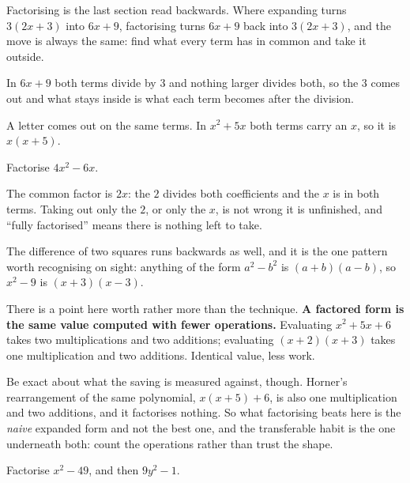 \begin{fr}
Factorising is the last section read backwards. Where expanding turns
$3(2x + 3)$ into $6x + 9$, factorising turns $6x + 9$ back into $3(2x + 3)$,
and the move is always the same: find what every term has in common and take
it outside.

In $6x + 9$ both terms divide by $3$ and nothing larger divides both, so the
$3$ comes out and what stays inside is what each term becomes after the
division.

A letter comes out on the same terms. In $x^{2} + 5x$ both terms carry an $x$,
so it is $x(x + 5)$.

Factorise $4x^{2} - 6x$.
\nextframe
\end{fr}

\begin{fr}
The common factor is $2x$: the $2$ divides both coefficients and the $x$ is in
both terms. Taking out only the $2$, or only the $x$, is not wrong \dash{} it
is unfinished, and \enquote{fully factorised} means there is nothing left to
take.

The difference of two squares runs backwards as well, and it is the one pattern
worth recognising on sight: anything of the form $a^{2} - b^{2}$ is
$(a+b)(a-b)$, so $x^{2} - 9$ is $(x+3)(x-3)$.

There is a point here worth rather more than the technique. \textbf{A factored
form is the same value computed with fewer operations.} Evaluating
$x^{2} + 5x + 6$ takes two multiplications and two additions; evaluating
$(x+2)(x+3)$ takes one multiplication and two additions. Identical value, less
work.

Be exact about what the saving is measured against, though. Horner's
rearrangement of the same polynomial, $x(x + 5) + 6$, is also one
multiplication and two additions, and it factorises nothing. So what
factorising beats here is the \emph{naive} expanded form and not the best one,
and the transferable habit is the one underneath both: count the operations
rather than trust the shape.

Factorise $x^{2} - 49$, and then $9y^{2} - 1$.
\dotline
\nextframe
\end{fr}

